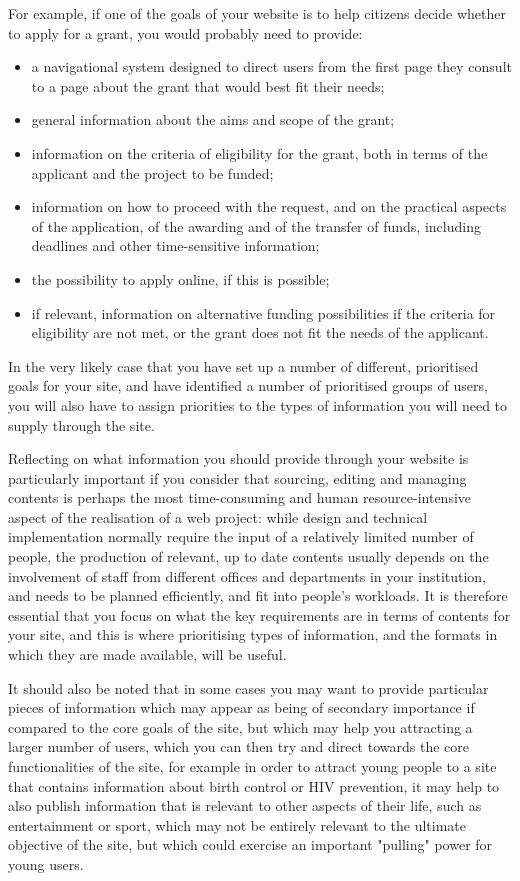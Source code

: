 For example, if one of the goals of your website is to help citizens decide whether to apply for a grant, you would probably need to provide:

\begin{itemize}
	\item a navigational system designed to direct users from the first page they consult to a page about the grant that would best fit their needs;
	\item 	general information about the aims and scope of the grant;
	\item information on the criteria of eligibility for the grant, both in terms of the applicant and the project to be funded;
	\item information on how to proceed with the request, and on the practical aspects of the application, of the awarding and of the transfer of funds, including deadlines and other time-sensitive information;
	\item the possibility to apply online, if this is possible;
	\item if relevant, information on alternative funding possibilities if the criteria for eligibility are not met, or the grant does not fit the needs of the applicant.
\end{itemize}

In the very likely case that you have set up a number of different, prioritised goals for your site, and have identified a number of prioritised groups of users, you will also have to assign priorities to the types of information you will need to supply through the site.

Reflecting on what information you should provide through your website is particularly important if you consider that sourcing, editing and managing contents is perhaps the most time-consuming and human resource-intensive aspect of the realisation of a web project: while design and technical implementation normally require the input of a relatively limited number of people, the production of relevant, up to date contents usually depends on the involvement of staff from different offices and departments in your institution, and needs to be planned efficiently, and fit into people's workloads. It is therefore essential that you focus on what the key requirements are in terms of contents for your site, and this is where prioritising types of information, and the formats in which they are made available, will be useful.

It should also be noted that in some cases you may want to provide particular pieces of information which may appear as being of secondary importance if compared to the core goals of the site, but which may help you attracting a larger number of users, which you can then try and direct towards the core functionalities of the site, for example in order to attract young people to a site that contains information about birth control or HIV prevention, it may help to also publish information that is relevant to other aspects of their life, such as entertainment or sport, which may not be entirely relevant to the ultimate objective of the site, but which could exercise an important "pulling" power for young users.

